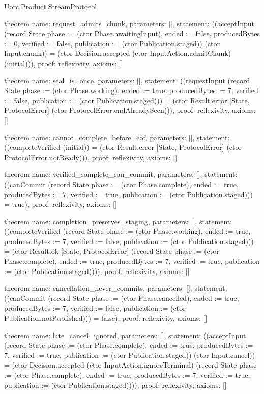 \begin{lexlean}{Uorc.Product.StreamProtocol}
\begin{semanticmodule}
theorem{
  name: request_admits_chunk,
  parameters: [],
  statement: ((acceptInput (record State {phase := (ctor Phase.awaitingInput), ended := false, producedBytes := 0, verified := false, publication := (ctor Publication.staged)}) (ctor Input.chunk)) = (ctor Decision.accepted (ctor InputAction.admitChunk) (initial))),
  proof: reflexivity{},
  axioms: []
}

theorem{
  name: seal_is_once,
  parameters: [],
  statement: ((requestInput (record State {phase := (ctor Phase.working), ended := true, producedBytes := 7, verified := false, publication := (ctor Publication.staged)})) = (ctor Result.error [State, ProtocolError] (ctor ProtocolError.endAlreadySeen))),
  proof: reflexivity{},
  axioms: []
}

theorem{
  name: cannot_complete_before_eof,
  parameters: [],
  statement: ((completeVerified (initial)) = (ctor Result.error [State, ProtocolError] (ctor ProtocolError.notReady))),
  proof: reflexivity{},
  axioms: []
}

theorem{
  name: verified_complete_can_commit,
  parameters: [],
  statement: ((canCommit (record State {phase := (ctor Phase.complete), ended := true, producedBytes := 7, verified := true, publication := (ctor Publication.staged)})) = true),
  proof: reflexivity{},
  axioms: []
}

theorem{
  name: completion_preserves_staging,
  parameters: [],
  statement: ((completeVerified (record State {phase := (ctor Phase.working), ended := true, producedBytes := 7, verified := false, publication := (ctor Publication.staged)})) = (ctor Result.ok [State, ProtocolError] (record State {phase := (ctor Phase.complete), ended := true, producedBytes := 7, verified := true, publication := (ctor Publication.staged)}))),
  proof: reflexivity{},
  axioms: []
}

theorem{
  name: cancellation_never_commits,
  parameters: [],
  statement: ((canCommit (record State {phase := (ctor Phase.cancelled), ended := true, producedBytes := 7, verified := false, publication := (ctor Publication.notPublished)})) = false),
  proof: reflexivity{},
  axioms: []
}

theorem{
  name: late_cancel_ignored,
  parameters: [],
  statement: ((acceptInput (record State {phase := (ctor Phase.complete), ended := true, producedBytes := 7, verified := true, publication := (ctor Publication.staged)}) (ctor Input.cancel)) = (ctor Decision.accepted (ctor InputAction.ignoreTerminal) (record State {phase := (ctor Phase.complete), ended := true, producedBytes := 7, verified := true, publication := (ctor Publication.staged)}))),
  proof: reflexivity{},
  axioms: []
}


\end{semanticmodule}
\end{lexlean}
